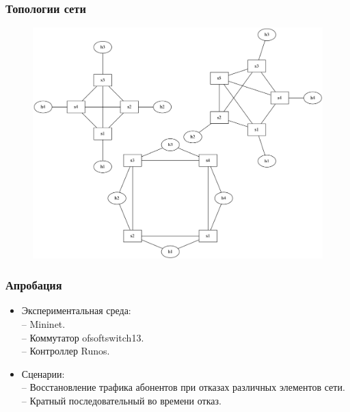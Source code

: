 \documentclass[14pt, handout]{beamer}
\begin{document}
\begin{frame}
\frametitle{Топологии сети}

\begin{figure}[h!]
	\vspace{-6ex}
	\includegraphics[height=0.95\textheight]{img/topos.png}
\end{figure}

\end{frame}


\begin{frame}
\frametitle{Апробация}

\begin{itemize}
	\item Экспериментальная среда:\\
	-- Mininet. \\
	-- Коммутатор ofsoftswitch13. \\
	-- Контроллер Runos.
	\item Сценарии:\\
	-- Восстановление трафика абонентов при отказах различных элементов сети. \\
	-- Кратный последовательный во времени отказ.
\end{itemize}

\end{frame}
\end{document}
